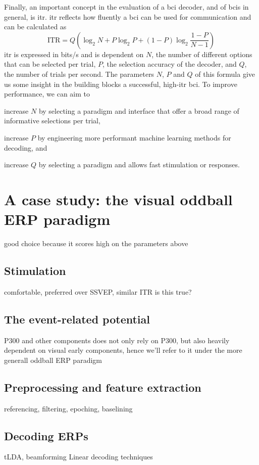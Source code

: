 Finally, an important concept in the evaluation of a \ac{bci} decoder, and of \acp{bci}
in general, is \ac{itr}.
\Ac{itr} reflects how fluently a \ac{bci} can be used for communication and can
be calculated as
\begin{equation}
	\text{ITR} = Q\left(\log_2N+P\log_2P+(1-P)\log_2\frac{1-P}{N-1}\right)
\end{equation}
\Ac{itr} is expressed in bits/s and is dependent on $N$, the number of
different options that can be selected per trial, $P$, the selection accuracy
of the decoder, and $Q$, the number of trials per second.
The parameters $N$, $P$ and $Q$ of this formula give us some insight in the
building blocks a successful, high-\ac{itr} \ac{bci}.
To improve performance, we can aim to
\begin{enumerate*}[label={\arabic*})]
\item increase $N$ by selecting a paradigm and interface that offer a
broad range of informative selections per trial,
\item increase $P$ by engineering more performant machine learning methods for
decoding, and
\item increase $Q$ by selecting a paradigm and allows fast stimulation or
responses.
\end{enumerate*}


\section{A case study: the visual oddball ERP paradigm}
good choice because it scores high on the parameters above
\subsection{Stimulation}
comfortable, preferred over SSVEP, similar ITR is this true?
\subsection{The event-related potential}
P300 and other components
does not only rely on P300, but also heavily dependent on visual early
components, hence we'll refer to it under the more generall oddball ERP
paradigm
\subsection{Preprocessing and feature extraction}
referencing, filtering, epoching, baselining
\subsection{Decoding ERPs}
tLDA, beamforming
Linear decoding techniques
